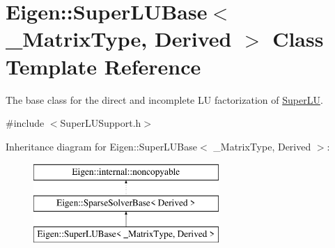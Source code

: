 \hypertarget{class_eigen_1_1_super_l_u_base}{}\section{Eigen\+::Super\+L\+U\+Base$<$ \+\_\+\+Matrix\+Type, Derived $>$ Class Template Reference}
\label{class_eigen_1_1_super_l_u_base}


The base class for the direct and incomplete LU factorization of \mbox{\hyperlink{class_eigen_1_1_super_l_u}{Super\+LU}}.  




{\ttfamily \#include $<$Super\+L\+U\+Support.\+h$>$}

Inheritance diagram for Eigen\+::Super\+L\+U\+Base$<$ \+\_\+\+Matrix\+Type, Derived $>$\+:\begin{figure}[H]
\begin{center}
\leavevmode
\includegraphics[height=3.000000cm]{class_eigen_1_1_super_l_u_base}
\end{center}
\end{figure}
